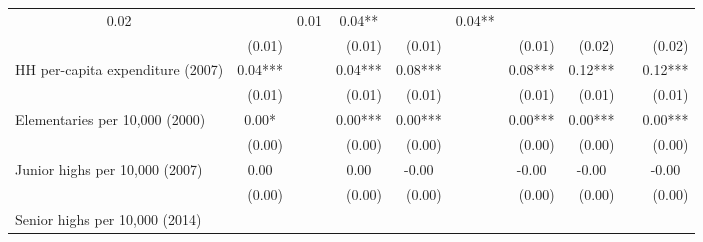 \begin{tabular}{llllllllll}
  \multicolumn{1}{c}{0.02 } &
  \multicolumn{1}{c}{} &
  \multicolumn{1}{c}{0.01 } &
  \multicolumn{1}{c}{0.04** } &
  \multicolumn{1}{c}{} &
  \multicolumn{1}{c}{0.04** } \\
\multicolumn{1}{l}{} &
  \multicolumn{1}{|r}{(0.01)} &
  \multicolumn{1}{r}{} &
  \multicolumn{1}{r}{(0.01)} &
  \multicolumn{1}{r}{(0.01)} &
  \multicolumn{1}{r}{} &
  \multicolumn{1}{r}{(0.01)} &
  \multicolumn{1}{r}{(0.02)} &
  \multicolumn{1}{r}{} &
  \multicolumn{1}{r}{(0.02)} \\
\multicolumn{1}{l}{HH per-capita expenditure (2007)} &
  \multicolumn{1}{|c}{0.04***} &
  \multicolumn{1}{c}{} &
  \multicolumn{1}{c}{0.04***} &
  \multicolumn{1}{c}{0.08***} &
  \multicolumn{1}{c}{} &
  \multicolumn{1}{c}{0.08***} &
  \multicolumn{1}{c}{0.12***} &
  \multicolumn{1}{c}{} &
  \multicolumn{1}{c}{0.12***} \\
\multicolumn{1}{l}{} &
  \multicolumn{1}{|r}{(0.01)} &
  \multicolumn{1}{r}{} &
  \multicolumn{1}{r}{(0.01)} &
  \multicolumn{1}{r}{(0.01)} &
  \multicolumn{1}{r}{} &
  \multicolumn{1}{r}{(0.01)} &
  \multicolumn{1}{r}{(0.01)} &
  \multicolumn{1}{r}{} &
  \multicolumn{1}{r}{(0.01)} \\
\multicolumn{1}{l}{Elementaries per 10,000 (2000)} &
  \multicolumn{1}{|c}{0.00* } &
  \multicolumn{1}{c}{} &
  \multicolumn{1}{c}{0.00***} &
  \multicolumn{1}{c}{0.00***} &
  \multicolumn{1}{c}{} &
  \multicolumn{1}{c}{0.00***} &
  \multicolumn{1}{c}{0.00***} &
  \multicolumn{1}{c}{} &
  \multicolumn{1}{c}{0.00***} \\
\multicolumn{1}{l}{} &
  \multicolumn{1}{|r}{(0.00)} &
  \multicolumn{1}{r}{} &
  \multicolumn{1}{r}{(0.00)} &
  \multicolumn{1}{r}{(0.00)} &
  \multicolumn{1}{r}{} &
  \multicolumn{1}{r}{(0.00)} &
  \multicolumn{1}{r}{(0.00)} &
  \multicolumn{1}{r}{} &
  \multicolumn{1}{r}{(0.00)} \\
\multicolumn{1}{l}{Junior highs per 10,000 (2007)} &
  \multicolumn{1}{|c}{0.00 } &
  \multicolumn{1}{c}{} &
  \multicolumn{1}{c}{0.00 } &
  \multicolumn{1}{c}{-0.00 } &
  \multicolumn{1}{c}{} &
  \multicolumn{1}{c}{-0.00 } &
  \multicolumn{1}{c}{-0.00 } &
  \multicolumn{1}{c}{} &
  \multicolumn{1}{c}{-0.00 } \\
\multicolumn{1}{l}{} &
  \multicolumn{1}{|r}{(0.00)} &
  \multicolumn{1}{r}{} &
  \multicolumn{1}{r}{(0.00)} &
  \multicolumn{1}{r}{(0.00)} &
  \multicolumn{1}{r}{} &
  \multicolumn{1}{r}{(0.00)} &
  \multicolumn{1}{r}{(0.00)} &
  \multicolumn{1}{r}{} &
  \multicolumn{1}{r}{(0.00)} \\
\multicolumn{1}{l}{Senior highs per 10,000 (2014)} &

\end{tabular}

